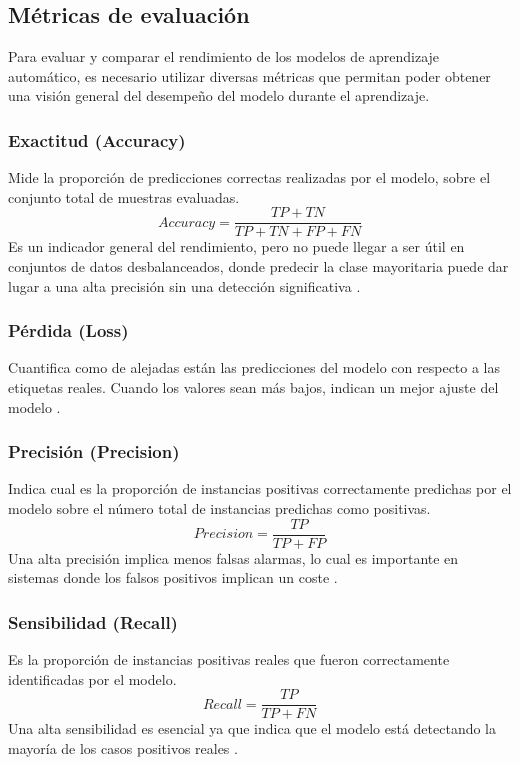 \subsection{Métricas de evaluación}
\label{subsec:evaluacion}
Para evaluar y comparar el rendimiento de los modelos de aprendizaje automático, es necesario utilizar diversas métricas que permitan poder obtener una visión general del desempeño del modelo durante el aprendizaje.

\subsubsection{Exactitud (Accuracy)}
\label{subsubsec:accuracy}
Mide la proporción de predicciones correctas realizadas por el modelo, sobre el conjunto total de muestras evaluadas.
\[Accuracy = \frac{TP + TN}{TP + TN + FP + FN}\]
Es un indicador general del rendimiento, pero no puede llegar a ser útil en conjuntos de datos desbalanceados, donde predecir la clase mayoritaria puede dar lugar a una alta precisión sin una detección significativa \cite{metricas}.

\subsubsection{Pérdida (Loss)}
\label{subsubsec:loss}
Cuantifica como de alejadas están las predicciones del modelo con respecto a las etiquetas reales. Cuando los valores sean más bajos, indican un mejor ajuste del modelo \cite{perdida}.

\subsubsection{Precisión (Precision)}
\label{subsubsec:precision}
Indica cual es la proporción de instancias positivas correctamente predichas por el modelo sobre el número total de instancias predichas como positivas.
\[Precision = \frac{TP}{TP + FP}\]
Una alta precisión implica menos falsas alarmas, lo cual es importante en sistemas donde los falsos positivos implican un coste \cite{metricas}.

\subsubsection{Sensibilidad (Recall)}
\label{subsubsec:recall}
Es la proporción de instancias positivas reales que fueron correctamente identificadas por el modelo.
\[Recall = \frac{TP}{TP + FN}\] 
Una alta sensibilidad es esencial ya que indica que el modelo está detectando la mayoría de los casos positivos reales \cite{metricas}.

